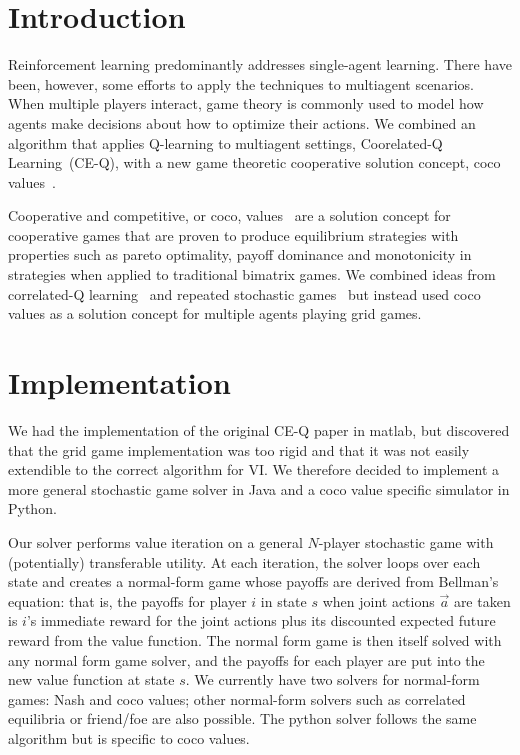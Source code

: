 
\section{Introduction}
\nocite{*}

\hspace{5mm}Reinforcement learning predominantly addresses single-agent learning. There have been, however, some efforts to apply the techniques to multiagent scenarios. When multiple players interact, game theory is commonly used to model how agents make decisions about how to optimize their actions. We combined an algorithm that applies Q-learning to multiagent settings, Coorelated-Q Learning~\cite{Greenwald03correlated-qlearning}(CE-Q), with a new game theoretic cooperative solution concept, coco values~\cite{Kalai_acooperative}.

Cooperative and competitive, or coco, values~\cite{Kalai:2011:CTP:1978721.1978725, Kalai:2010:CCS:1807342.1807397, Kalai_acooperative} are a solution concept for cooperative games that are proven to produce equilibrium strategies with properties such as pareto optimality, payoff dominance and monotonicity in strategies when applied to traditional bimatrix games. We combined ideas from correlated-Q learning~\cite{Greenwald03correlated-qlearning} and repeated stochastic games~\cite{DBLP:journals/corr/abs-1206-3277} but instead used coco values as a solution concept for multiple agents playing grid games. 

\section{Implementation}
\hspace{5mm}We had the implementation of the original CE-Q paper in matlab, but discovered that the grid game implementation was too rigid and that it was not easily extendible to the correct algorithm for VI. We therefore decided to implement a more general stochastic game solver in Java and a coco value specific simulator in Python. 

\hspace{5mm}Our solver performs value iteration on a general $N$-player stochastic game with (potentially) transferable utility. At each iteration, the solver loops over each state and creates a normal-form game whose payoffs  are derived from Bellman's equation: that is, the payoffs for player $i$ in state $s$ when joint actions $\vec{a}$ are taken is $i$'s immediate reward for the joint actions plus its discounted expected future reward from the value function. The normal form game is then itself solved with any normal form game solver, and the payoffs for each player are put into the new value function at state $s$. We currently have two solvers for normal-form games: Nash and coco values; other normal-form solvers such as correlated equilibria or friend/foe are also possible. The python solver follows the same algorithm but is specific to coco values.

